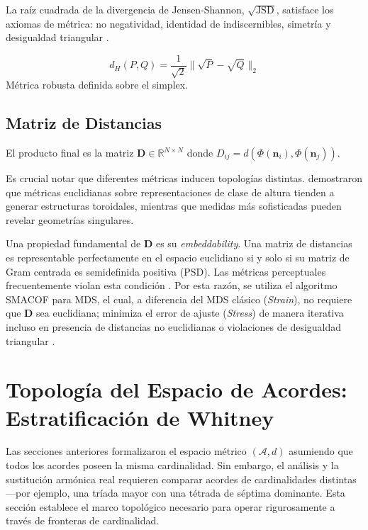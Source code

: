 \begin{proposition}
La raíz cuadrada de la divergencia de Jensen-Shannon, $\sqrt{\text{JSD}}$, satisface los axiomas de métrica: no negatividad, identidad de indiscernibles, simetría y desigualdad triangular \cite{Endres2003}.
\end{proposition}

\begin{definition}
\begin{equation}
d_H(P, Q) = \frac{1}{\sqrt{2}} \|\sqrt{P} - \sqrt{Q}\|_2
\end{equation}
Métrica robusta definida sobre el simplex.
\end{definition}

\subsection{Matriz de Distancias}

El producto final es la matriz $\mathbf{D} \in \mathbb{R}^{N \times N}$ donde $D_{ij} = d(\Phi(\mathbf{n}_i), \Phi(\mathbf{n}_j))$.

Es crucial notar que diferentes métricas inducen topologías distintas. \cite{burgoyneVISUALIZATIONLOWDIMENSIONAL} demostraron que métricas euclidianas sobre representaciones de clase de altura tienden a generar estructuras toroidales, mientras que medidas más sofisticadas pueden revelar geometrías singulares.

Una propiedad fundamental de $\mathbf{D}$ es su \textit{embeddability}. Una matriz de distancias es representable perfectamente en el espacio euclidiano si y solo si su matriz de Gram centrada es semidefinida positiva (PSD). Las métricas perceptuales frecuentemente violan esta condición \cite{tymoczkoGeometryMusicHarmony2011}. Por esta razón, se utiliza el algoritmo SMACOF para MDS, el cual, a diferencia del MDS clásico (\textit{Strain}), no requiere que $\mathbf{D}$ sea euclidiana; minimiza el error de ajuste (\textit{Stress}) de manera iterativa incluso en presencia de distancias no euclidianas o violaciones de desigualdad triangular \cite{Borg2005}.

\section{Topología del Espacio de Acordes: Estratificación de Whitney}
\label{sec:estratificacion}

Las secciones anteriores formalizaron el espacio métrico $(\mathcal{A}, d)$ asumiendo que todos los acordes poseen la misma cardinalidad. Sin embargo, el análisis y la sustitución armónica real requieren comparar acordes de cardinalidades distintas ---por ejemplo, una tríada mayor con una tétrada de séptima dominante. Esta sección establece el marco topológico necesario para operar rigurosamente a través de fronteras de cardinalidad.


